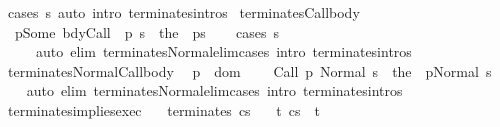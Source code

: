 \begin{isabellebody}
\isatagproof
{}\isamarkupfalse%
\ {\isacharparenleft}cases\ s{\isacharparenright}\ {\isacharparenleft}auto\ intro{\isacharcolon}\ terminates{\isachardot}intros{\isacharparenright}%
\endisatagproof
{\isafoldproof}%
%
\isadelimproof
\isanewline
%
\endisadelimproof
\isanewline
{}\isamarkupfalse%
\ terminates{\isacharunderscore}Call{\isacharunderscore}body{\isacharcolon}\ \isanewline
\ {\isachardoublequoteopen}{\isasymGamma}\ p{\isacharequal}Some\ bdy{\isasymLongrightarrow}{\isasymGamma}{\isasymturnstile}Call\ \ p\ {\isasymdown}s\ {\isacharequal}\ {\isasymGamma}{\isasymturnstile}{\isacharparenleft}the\ {\isacharparenleft}{\isasymGamma}\ p{\isacharparenright}{\isacharparenright}{\isasymdown}s{\isachardoublequoteclose}\isanewline
%
\isadelimproof
\ \ %
\endisadelimproof
%
\isatagproof
{}\isamarkupfalse%
\ {\isacharparenleft}cases\ s{\isacharparenright}\isanewline
\ \ \ \ \ {\isacharparenleft}auto\ elim{\isacharcolon}\ terminates{\isacharunderscore}Normal{\isacharunderscore}elim{\isacharunderscore}cases\ intro{\isacharcolon}\ terminates{\isachardot}intros{\isacharparenright}%
\endisatagproof
{\isafoldproof}%
%
\isadelimproof
\isanewline
%
\endisadelimproof
\isanewline
{}\isamarkupfalse%
\ terminates{\isacharunderscore}Normal{\isacharunderscore}Call{\isacharunderscore}body{\isacharcolon}\ \isanewline
\ {\isachardoublequoteopen}p\ {\isasymin}\ dom\ {\isasymGamma}\ {\isasymLongrightarrow}\isanewline
\ \ {\isasymGamma}{\isasymturnstile}Call\ p\ {\isasymdown}Normal\ s\ {\isacharequal}\ {\isasymGamma}{\isasymturnstile}{\isacharparenleft}the\ {\isacharparenleft}{\isasymGamma}\ p{\isacharparenright}{\isacharparenright}{\isasymdown}Normal\ s{\isachardoublequoteclose}\isanewline
%
\isadelimproof
\ \ %
\endisadelimproof
%
\isatagproof
{}\isamarkupfalse%
\ {\isacharparenleft}auto\ elim{\isacharcolon}\ terminates{\isacharunderscore}Normal{\isacharunderscore}elim{\isacharunderscore}cases\ intro{\isacharcolon}\ terminates{\isachardot}intros{\isacharparenright}%
\endisatagproof
{\isafoldproof}%
%
\isadelimproof
\isanewline
%
\endisadelimproof
\isanewline
{}\isamarkupfalse%
\ terminates{\isacharunderscore}implies{\isacharunderscore}exec{\isacharcolon}\isanewline
\ \ \ terminates{\isacharcolon}\ {\isachardoublequoteopen}{\isasymGamma}{\isasymturnstile}c{\isasymdown}s{\isachardoublequoteclose}\isanewline
\ \ \ {\isachardoublequoteopen}{\isasymexists}t{\isachardot}\ {\isasymGamma}{\isasymturnstile}{\isasymlangle}c{\isacharcomma}s{\isasymrangle}\ {\isasymRightarrow}\ t{\isachardoublequoteclose}\isanewline

\end{isabellebody}
